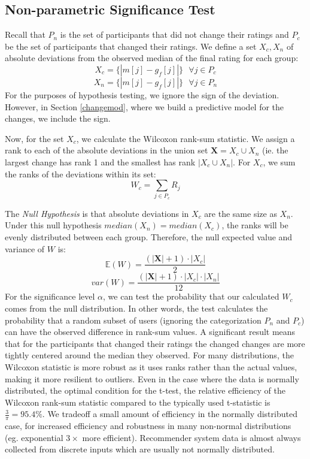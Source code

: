 \subsection{Non-parametric Significance Test}
Recall that $P_n$ is the set of participants that did not change their ratings and $P_c$ be the set of participants that changed their ratings.
We define a set $X_c,X_n$ of absolute deviations from the observed median of the final rating for each group:
\begin{equation}
X_c = \{|m[j] - g_f[j]|\}\text{ }\forall j \in P_c
\end{equation}
\begin{equation}
X_n = \{|m[j] - g_f[j]|\}\text{ }\forall j \in P_n
\end{equation}
For the purposes of hypothesis testing, we ignore the sign of the deviation.
However, in Section \ref{changemod}, where we build a predictive model for the changes, we include the sign.

Now, for the set $X_c$, we calculate the Wilcoxon rank-sum statistic.
We assign a rank to each of the absolute deviations in the union set $\textbf{X} = X_c \cup X_n$ (ie. the largest change has rank 1 and the smallest has rank $|X_c \cup X_n|$.
For $X_c$, we sum the ranks of the deviations within its set:
\begin{equation}
W_c = \sum_{j \in P_c} R_j
\end{equation}

The \emph{Null Hypothesis} is that absolute deviations in $X_c$ are the same size as $X_n$. 
Under this null hypothesis $median(X_n) = median(X_c)$, the ranks will be evenly distributed between each group. 
Therefore, the null expected value and variance of $W$ is:
\begin{equation}
\mathbb{E}(W) = \frac{(|\textbf{X}| + 1)\cdot |X_c|}{2}
\end{equation}
\begin{equation}
var(W) = \frac{(|\textbf{X}| + 1)\cdot |X_c| \cdot |X_n|}{12}
\end{equation}
For the significance level $\alpha$, we can test the probability that our calculated $W_c$ comes from the null distribution.
In other words, the test calculates the probability that a random subset of users (ignoring the categorization $P_n$ and $P_c$) can have the observed difference in rank-sum values.
A significant result means that for the participants that changed their ratings the changed changes are more tightly centered around the median they observed.
For many distributions, the Wilcoxon statistic is more robust as it uses ranks rather than the actual values, making it more resilient to outliers.
Even in the case where the data is normally distributed, the optimal condition for the t-test, the relative efficiency of the Wilcoxon rank-sum statistic compared to the typically used t-statistic is $\frac{3}{\pi}=95.4\%$.
We tradeoff a small amount of efficiency in the normally distributed case, for increased efficiency and robustness in many non-normal distributions (eg. exponential $3\times$ more efficient).
Recommender system data is almost always collected from discrete inputs which are usually not normally distributed.

